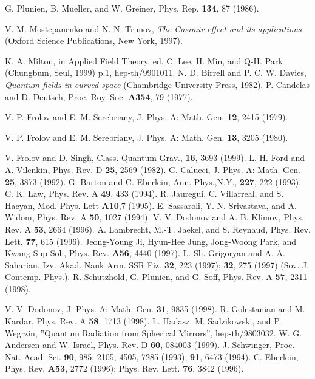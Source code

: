 \documentclass[a4paper,11pt]{article}
\begin{document}
\begin{thebibliography}{99}

 G. Plunien, B. Mueller, and W. Greiner, Phys. Rep. {\bf 134}, 87
 (1986).

 V. M. Mostepanenko and N. N. Trunov, {\it The Casimir effect
 and its applications} (Oxford Science Publications, New York, 1997).

K. A. Milton, in Applied Field Theory, ed. C. Lee,
 H. Min, and Q-H. Park (Chungbum, Seul, 1999) p.1, hep-th/9901011.
 N. D. Birrell and P. C. W. Davies, {\it Quantum fields
in curved space} (Chambridge University Press, 1982).
  P. Candelas and D. Deutsch, Proc. Roy. Soc.
 {\bf A354}, 79 (1977).

  V. P. Frolov and E. M. Serebriany, J. Phys. A: Math.
 Gen. {\bf 12}, 2415 (1979).

  V. P. Frolov and E. M. Serebriany, J. Phys. A: Math.
 Gen. {\bf 13}, 3205 (1980).

  V. Frolov and D. Singh, Class. Quantum Grav., {\bf
 16}, 3693 (1999).
 L. H. Ford and A. Vilenkin, Phys. Rev. D {\bf 25},
2569 (1982).
 G. Calucci, J. Phys. A: Math. Gen. {\bf 25}, 3873
 (1992).
 G. Barton and C. Eberlein, Ann. Phys.,N.Y., {\bf 227},
222 (1993).
 C. K. Law, Phys. Rev. A {\bf 49}, 433 (1994).
 R. Jauregui, C. Villarreal, and
 S. Hacyan, Mod. Phys. Lett {\bf A10},7 (1995).
 E. Sassaroli, Y. N. Srivastava, and A. Widom,
 Phys. Rev. A {\bf 50}, 1027 (1994).
 V. V. Dodonov and A. B. Klimov, Phys. Rev. A {\bf
 53}, 2664 (1996).
 A. Lambrecht, M.-T. Jaekel, and S. Reynaud, Phys.
 Rev. Lett. {\bf 77}, 615 (1996).
 Jeong-Young Ji, Hyun-Hee Jung, Jong-Woong Park, and
 Kwang-Sup Soh, Phys. Rev. {\bf A56}, 4440 (1997).
 L. Sh. Grigoryan and A. A. Saharian, Izv. Akad. Nauk
Arm. SSR Fiz. {\bf 32}, 223 (1997); {\bf 32}, 275 (1997) (Sov. J. Contemp.
Phys.).
 R. Schutzhold, G. Plunien, and G. Soff,
 Phys. Rev. A {\bf 57}, 2311 (1998).

 V. V. Dodonov, J. Phys. A: Math. Gen. {\bf 31}, 9835 (1998).
 R. Golestanian and M. Kardar, Phys. Rev. A {\bf 58}, 1713 (1998).
 L. Hadasz, M. Sadzikowski, and P. Wegrzin, ''Quantum Radiation
from Spherical Mirrors'', hep-th/9803032.
 W. G. Andersen and W. Israel, Phys. Rev. D {\bf 60},
084003 (1999).
 J. Schwinger, Proc. Nat. Acad. Sci. {\bf 90}, 985,
 2105, 4505, 7285 (1993); {\bf 91}, 6473 (1994).
 C. Eberlein, Phys. Rev. {\bf A53}, 2772 (1996);
Phys. Rev. Lett. {\bf 76}, 3842 (1996).


\end{thebibliography}
\end{document}
